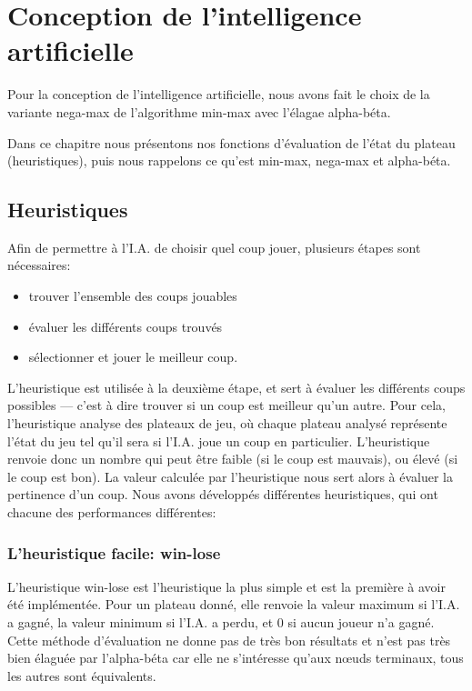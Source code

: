 \chapter{Conception de l'intelligence artificielle}\label{chapter:intelligence-artificielle}

Pour la conception de l'intelligence artificielle, nous avons fait le choix de la variante nega-max de l'algorithme min-max
avec l'élagae alpha-béta.

Dans ce chapitre nous présentons nos fonctions d'évaluation de l'état du plateau (heuristiques),
puis nous rappelons ce qu'est min-max, nega-max et alpha-béta.

\section{Heuristiques}

Afin de permettre à l'I.A. de choisir quel coup jouer, plusieurs étapes sont nécessaires:
\begin{itemize}
    \item trouver l'ensemble des coups jouables
    \item évaluer les différents coups trouvés
    \item sélectionner et jouer le meilleur coup.
\end{itemize}

L'heuristique est utilisée à la deuxième étape, et sert à évaluer les différents coups possibles
— c'est à dire trouver si un coup est meilleur qu'un autre. Pour cela, l'heuristique analyse des
plateaux de jeu, où chaque plateau analysé représente l'état du jeu tel qu'il sera si l'I.A. joue
un coup en particulier. L'heuristique renvoie donc un nombre qui peut être faible (si le coup est
mauvais), ou élevé (si le coup est bon). La valeur calculée par l'heuristique nous sert alors à
évaluer la pertinence d'un coup. Nous avons développés différentes heuristiques, qui ont chacune
des performances différentes:

\subsection{L'heuristique facile: win-lose}

L'heuristique win-lose est l'heuristique la plus simple et est la première à avoir été implémentée.
Pour un plateau donné, elle renvoie la valeur maximum si l'I.A. a gagné, la valeur minimum si
l'I.A. a perdu, et 0 si aucun joueur n'a gagné. Cette méthode d'évaluation ne donne pas de très bon
résultats et n'est pas très bien élaguée par l'alpha-béta car elle ne s'intéresse qu'aux nœuds terminaux, tous les
autres sont équivalents.

